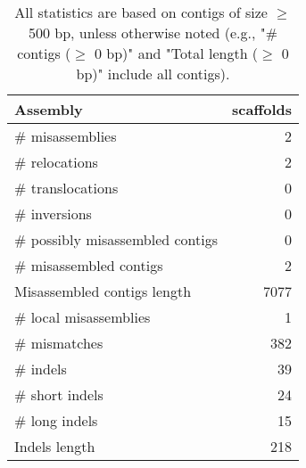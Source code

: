 \documentclass[12pt,a4paper]{article}
\begin{document}
\begin{table}[ht]
\begin{center}
\caption{All statistics are based on contigs of size $\geq$ 500 bp, unless otherwise noted (e.g., "\# contigs ($\geq$ 0 bp)" and "Total length ($\geq$ 0 bp)" include all contigs).}
\begin{tabular}{|l*{1}{|r}|}
\hline
Assembly & scaffolds \\ \hline
\# misassemblies & 2 \\ \hline
\hspace{5mm}\# relocations & 2 \\ \hline
\hspace{5mm}\# translocations & 0 \\ \hline
\hspace{5mm}\# inversions & 0 \\ \hline
\# possibly misassembled contigs & 0 \\ \hline
\# misassembled contigs & 2 \\ \hline
Misassembled contigs length & 7077 \\ \hline
\# local misassemblies & 1 \\ \hline
\# mismatches & 382 \\ \hline
\# indels & 39 \\ \hline
\hspace{5mm}\# short indels & 24 \\ \hline
\hspace{5mm}\# long indels & 15 \\ \hline
Indels length & 218 \\ \hline
\end{tabular}
\end{center}
\end{table}
\end{document}
